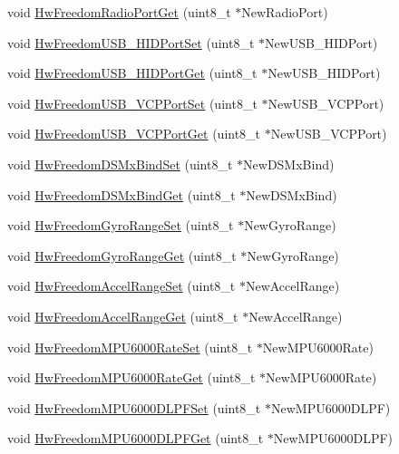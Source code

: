 \begin{DoxyCompactItemize}
\item 
void \hyperlink{group___hw_freedom_ga824884cc3c9ea3a4ed4de0bd38fb5398}{\-Hw\-Freedom\-Radio\-Port\-Get} (uint8\-\_\-t $\ast$\-New\-Radio\-Port)
\item 
void \hyperlink{group___hw_freedom_ga9597cf64e86e2e3296ac93fbb8181510}{\-Hw\-Freedom\-U\-S\-B\-\_\-\-H\-I\-D\-Port\-Set} (uint8\-\_\-t $\ast$\-New\-U\-S\-B\-\_\-\-H\-I\-D\-Port)
\item 
void \hyperlink{group___hw_freedom_ga8f8f59063dcfd36b4d410de890b386d8}{\-Hw\-Freedom\-U\-S\-B\-\_\-\-H\-I\-D\-Port\-Get} (uint8\-\_\-t $\ast$\-New\-U\-S\-B\-\_\-\-H\-I\-D\-Port)
\item 
void \hyperlink{group___hw_freedom_ga33b236c219d1c2219049cac5064f1a0c}{\-Hw\-Freedom\-U\-S\-B\-\_\-\-V\-C\-P\-Port\-Set} (uint8\-\_\-t $\ast$\-New\-U\-S\-B\-\_\-\-V\-C\-P\-Port)
\item 
void \hyperlink{group___hw_freedom_ga9b80c4215355f55df96f59e8a6ff4c1a}{\-Hw\-Freedom\-U\-S\-B\-\_\-\-V\-C\-P\-Port\-Get} (uint8\-\_\-t $\ast$\-New\-U\-S\-B\-\_\-\-V\-C\-P\-Port)
\item 
void \hyperlink{group___hw_freedom_ga162995531a5998594d282907b86101c9}{\-Hw\-Freedom\-D\-S\-Mx\-Bind\-Set} (uint8\-\_\-t $\ast$\-New\-D\-S\-Mx\-Bind)
\item 
void \hyperlink{group___hw_freedom_ga9eeb08f36d113cbbb4a02152763e4ad0}{\-Hw\-Freedom\-D\-S\-Mx\-Bind\-Get} (uint8\-\_\-t $\ast$\-New\-D\-S\-Mx\-Bind)
\item 
void \hyperlink{group___hw_freedom_ga790501d3c8ffeee0caa4313687909087}{\-Hw\-Freedom\-Gyro\-Range\-Set} (uint8\-\_\-t $\ast$\-New\-Gyro\-Range)
\item 
void \hyperlink{group___hw_freedom_ga96178632c4712803b25c944a9de0c5e5}{\-Hw\-Freedom\-Gyro\-Range\-Get} (uint8\-\_\-t $\ast$\-New\-Gyro\-Range)
\item 
void \hyperlink{group___hw_freedom_gad0ebb7a372984e8241571bab874d54b9}{\-Hw\-Freedom\-Accel\-Range\-Set} (uint8\-\_\-t $\ast$\-New\-Accel\-Range)
\item 
void \hyperlink{group___hw_freedom_ga23c9939b8b167a593c0d144134ff802c}{\-Hw\-Freedom\-Accel\-Range\-Get} (uint8\-\_\-t $\ast$\-New\-Accel\-Range)
\item 
void \hyperlink{group___hw_freedom_ga22ad432bb274deaaeeedc4b38b334a72}{\-Hw\-Freedom\-M\-P\-U6000\-Rate\-Set} (uint8\-\_\-t $\ast$\-New\-M\-P\-U6000\-Rate)
\item 
void \hyperlink{group___hw_freedom_ga8f616fe422fb27045dfb4c57c091c31b}{\-Hw\-Freedom\-M\-P\-U6000\-Rate\-Get} (uint8\-\_\-t $\ast$\-New\-M\-P\-U6000\-Rate)
\item 
void \hyperlink{group___hw_freedom_ga22d0ad6d1102e79f8d41f59e7fa92010}{\-Hw\-Freedom\-M\-P\-U6000\-D\-L\-P\-F\-Set} (uint8\-\_\-t $\ast$\-New\-M\-P\-U6000\-D\-L\-P\-F)
\item 
void \hyperlink{group___hw_freedom_ga741fd44ae69e358617e9b2f0b14a9b98}{\-Hw\-Freedom\-M\-P\-U6000\-D\-L\-P\-F\-Get} (uint8\-\_\-t $\ast$\-New\-M\-P\-U6000\-D\-L\-P\-F)
\end{DoxyCompactItemize}



